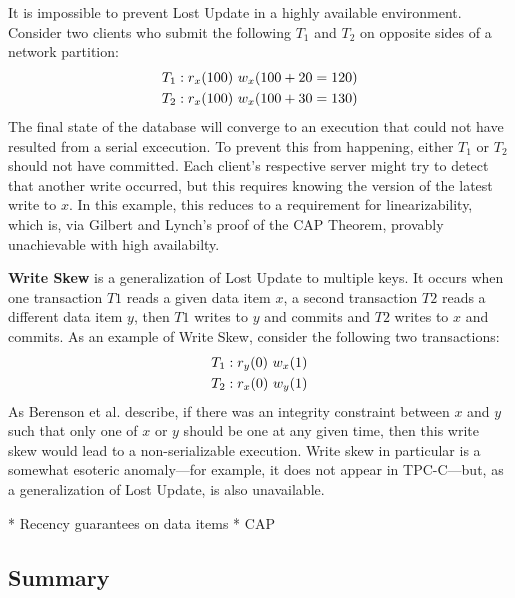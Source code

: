 It is impossible to prevent Lost Update in a highly available
environment. Consider two clients who submit the following $T_1$ and
$T_2$ on opposite sides of a network partition:
\begin{align*}
\small
T_1 &: r_x(100)~w_x(100+20=120)
\\T_2 &: r_x(100)~w_x(100+30=130)
\end{align*}
The final state of the database will converge to an execution that
could not have resulted from a serial excecution. To prevent this from
happening, either $T_1$ or $T_2$ should not have committed. Each
client's respective server might try to detect that another write
occurred, but this requires knowing the version of the latest write to
$x$. In this example, this reduces to a requirement for
linearizability, which is, via Gilbert and Lynch's proof of the CAP
Theorem, provably unachievable with high availabilty.

\textbf{Write Skew} is a generalization of Lost Update to multiple
keys. It occurs when one transaction $T1$ reads a given data item $x$,
a second transaction $T2$ reads a different data item $y$, then $T1$
writes to $y$ and commits and $T2$ writes to $x$ and commits. As an
example of Write Skew, consider the following two transactions:
\begin{align*}
\small
T_1 &: r_y(0)~w_x(1)
\\T_2 &: r_x(0)~w_y(1)
\end{align*}
As Berenson et al. describe, if there was an integrity constraint
between $x$ and $y$ such that only one of $x$ or $y$ should be one at
any given time, then this write skew would lead to a non-serializable
execution. Write skew in particular is a somewhat esoteric
anomaly---for example, it does not appear in TPC-C---but, as a
generalization of Lost Update, is also unavailable.

\textbf{} 

* Recency guarantees on data items
	* CAP



\subsection{Summary}
\label{sec:hat-summary}

 \newcommand{\lostupdate}{$^\dagger$}
 \newcommand{\rwskew}{$^\ddagger$}
 \newcommand{\linearizable}{$^\oplus$}

